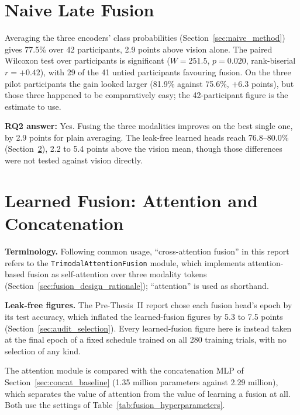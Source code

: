 \section{Naive Late Fusion}
\label{sec:naive_late_fusion_results}

Averaging the three encoders' class probabilities (Section~\ref{sec:naive_method}) gives 77.5\% over 42 participants, 2.9 points above vision alone. The paired Wilcoxon test over participants is significant ($W = 251.5$, $p = 0.020$, rank-biserial $r = +0.42$), with 29 of the 41 untied participants favouring fusion. On the three pilot participants the gain looked larger (81.9\% against 75.6\%, $+6.3$ points), but those three happened to be comparatively easy; the 42-participant figure is the estimate to use.

\textbf{RQ2 answer:} Yes. Fusing the three modalities improves on the best single one, by 2.9 points for plain averaging. The leak-free learned heads reach 76.8--80.0\% (Section~\ref{sec:learned_fusion_results}), 2.2 to 5.4 points above the vision mean, though those differences were not tested against vision directly.

\section{Learned Fusion: Attention and Concatenation}
\label{sec:learned_fusion_results}
\label{sec:cross_attention_results}
\label{sec:concat_mlp_results}

\textbf{Terminology.} Following common usage, ``cross-attention fusion'' in this report refers to the \texttt{TrimodalAttentionFusion} module, which implements attention-based fusion as self-attention over three modality tokens (Section~\ref{sec:fusion_design_rationale}); ``attention'' is used as shorthand.

\textbf{Leak-free figures.} The Pre-Thesis~II report chose each fusion head's epoch by its test accuracy, which inflated the learned-fusion figures by 5.3 to 7.5 points (Section~\ref{sec:audit_selection}). Every learned-fusion figure here is instead taken at the final epoch of a fixed schedule trained on all 280 training trials, with no selection of any kind.

The attention module is compared with the concatenation MLP of Section~\ref{sec:concat_baseline} (1.35 million parameters against 2.29 million), which separates the value of attention from the value of learning a fusion at all. Both use the settings of Table~\ref{tab:fusion_hyperparameters}.

